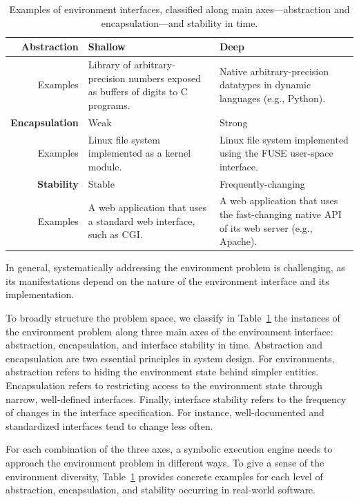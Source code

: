 \begin{table}
  \centering
  \small
  \begin{tabular}{r p{6cm} p{6cm}}
    
    \textbf{Abstraction} & Shallow & Deep \\
    \hline
    \bigskip Examples      & Library of arbitrary-precision numbers exposed as buffers of digits to C programs.     & Native arbitrary-precision datatypes in dynamic languages (e.g., Python). \\
    
    \textbf{Encapsulation} & Weak & Strong \\
    \hline
    \bigskip Examples      & Linux file system implemented as a kernel module.   & Linux file system implemented using the FUSE user-space interface. \\
    
    \textbf{Stability}   & Stable    & Frequently-changing \\
    \hline
        Examples          & A web application that uses a standard web interface, such as CGI.    & A web application that uses the fast-changing native API of its web server (e.g., Apache). \\
  \end{tabular}
  \caption{Examples of environment interfaces, classified along main axes---abstraction and encapsulation---and stability in time.
}
  \label{tab:intro:env}
\end{table}

In general, systematically addressing the environment problem is challenging, as its manifestations depend on the nature of the environment interface and its implementation.

To broadly structure the problem space, we classify in Table~\ref{tab:intro:env} the instances of the environment problem along three main axes of the environment interface: abstraction, encapsulation, and interface stability in time.
%
Abstraction and encapsulation are two essential principles in system design.  For environments, abstraction refers to hiding the environment state behind simpler entities.
%
Encapsulation refers to restricting access to the environment state through narrow, well-defined interfaces.
%
Finally, interface stability refers to the frequency of changes in the interface specification.  For instance, well-documented and standardized interfaces tend to change less often.

For each combination of the three axes, a symbolic execution engine needs to approach the environment problem in different ways.
%
To give a sense of the environment diversity, Table~\ref{tab:intro:env} provides concrete examples for each level of abstraction, encapsulation, and stability occurring in real-world software.


